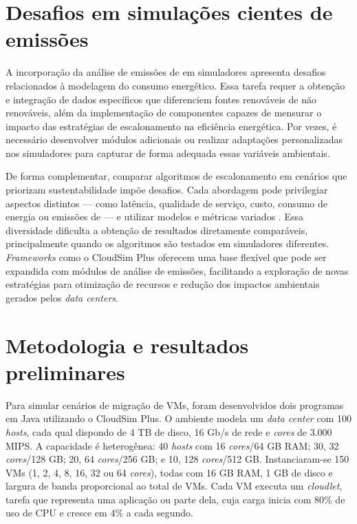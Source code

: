 \documentclass[12pt]{article}
\begin{document}
\section{Desafios em simulações cientes de emissões}
A incorporação da análise de emissões de  em simuladores apresenta desafios relacionados à modelagem do consumo energético. Essa tarefa requer a obtenção e integração de dados específicos que diferenciem fontes renováveis de não renováveis, além da implementação de componentes capazes de mensurar o impacto das estratégias de escalonamento na eficiência energética. Por vezes, é necessário desenvolver módulos adicionais ou realizar adaptações personalizadas nos simuladores para capturar de forma adequada essas variáveis ambientais.

De forma complementar, comparar algoritmos de escalonamento em cenários que priorizam sustentabilidade impõe desafios. Cada abordagem pode privilegiar aspectos distintos --- como latência, qualidade de serviço, custo, consumo de energia ou emissões de  --- e utilizar modelos e métricas variados \cite{kumar:19}. Essa diversidade dificulta a obtenção de resultados diretamente comparáveis, principalmente quando os algoritmos são testados em simuladores diferentes. \textit{Frameworks} como o CloudSim Plus \cite{silva:17} oferecem uma base flexível que pode ser expandida com módulos de análise de emissões, facilitando a exploração de novas estratégias para otimização de recursos e redução dos impactos ambientais gerados pelos \textit{data centers}.

\section{Metodologia e resultados preliminares}

Para simular cenários de migração de VMs, foram desenvolvidos dois programas em Java utilizando o CloudSim Plus. O ambiente modela um \textit{data center} com 100 \textit{hosts}, cada qual dispondo de 4 TB de disco, 16 Gb/s de rede e \textit{cores} de 3.000 MIPS. A capacidade é heterogênea: 40 \textit{hosts} com 16 \textit{cores}/64 GB RAM; 30, 32 \textit{cores}/128 GB; 20, 64 \textit{cores}/256 GB; e 10, 128 \textit{cores}/512 GB. Instanciaram-se 150 VMs (1, 2, 4, 8, 16, 32 ou 64 \textit{cores}), todas com 16 GB RAM, 1 GB de disco e largura de banda proporcional ao total de VMs. Cada VM executa um \textit{cloudlet}, tarefa que representa uma aplicação ou parte dela, cuja carga inicia com 80\% de uso de CPU e cresce em 4\% a cada segundo.
\end{document}
